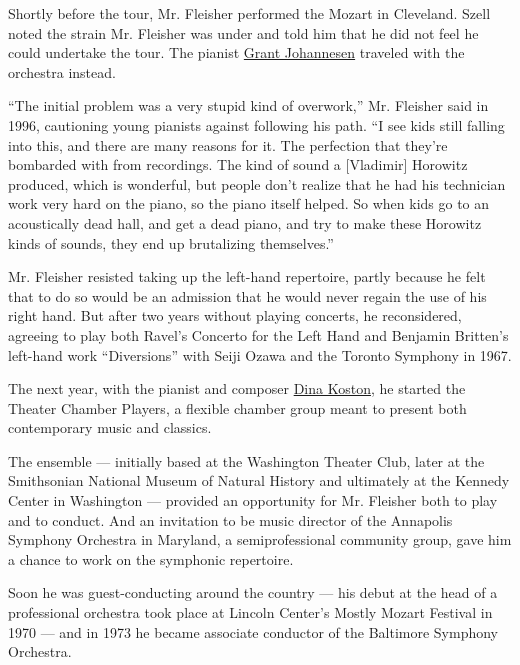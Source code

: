 Shortly before the tour, Mr. Fleisher performed the Mozart in Cleveland.
Szell noted the strain Mr. Fleisher was under and told him that he did
not feel he could undertake the tour. The pianist
\href{https://www.nytimes3xbfgragh.onion/2005/03/30/arts/music/grant-johannesen-unorthodox-pianist-is-dead-at-83.html\#:~:text=Grant\%20Johannesen\%2C\%20a\%20pianist\%20best,David\%20Johannesen\%2C\%20announced\%20the\%20death.}{Grant
Johannesen} traveled with the orchestra instead.

``The initial problem was a very stupid kind of overwork,'' Mr. Fleisher
said in 1996, cautioning young pianists against following his path. ``I
see kids still falling into this, and there are many reasons for it. The
perfection that they're bombarded with from recordings. The kind of
sound a {[}Vladimir{]} Horowitz produced, which is wonderful, but people
don't realize that he had his technician work very hard on the piano, so
the piano itself helped. So when kids go to an acoustically dead hall,
and get a dead piano, and try to make these Horowitz kinds of sounds,
they end up brutalizing themselves.''

Mr. Fleisher resisted taking up the left-hand repertoire, partly because
he felt that to do so would be an admission that he would never regain
the use of his right hand. But after two years without playing concerts,
he reconsidered, agreeing to play both Ravel's Concerto for the Left
Hand and Benjamin Britten's left-hand work ``Diversions'' with Seiji
Ozawa and the Toronto Symphony in 1967.

The next year, with the pianist and composer
\href{https://www.rogershapirofund.org/founders/dina-koston/}{Dina
Koston}, he started the Theater Chamber Players, a flexible chamber
group meant to present both contemporary music and classics.

The ensemble --- initially based at the Washington Theater Club, later
at the Smithsonian National Museum of Natural History and ultimately at
the Kennedy Center in Washington --- provided an opportunity for Mr.
Fleisher both to play and to conduct. And an invitation to be music
director of the Annapolis Symphony Orchestra in Maryland, a
semiprofessional community group, gave him a chance to work on the
symphonic repertoire.

Soon he was guest-conducting around the country --- his debut at the
head of a professional orchestra took place at Lincoln Center's Mostly
Mozart Festival in 1970 --- and in 1973 he became associate conductor of
the Baltimore Symphony Orchestra.

